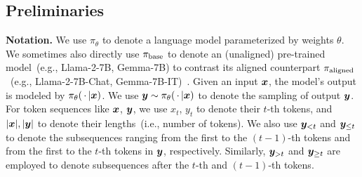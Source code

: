 

\vspace{-0.2em}
\subsection{Preliminaries}
\label{subsec:preliminaries}
\vspace{-0.2em}

\textbf{Notation.} We use $\pi_{\theta}$ to denote a language model parameterized by weights $\theta$. We sometimes also directly use $\pi_{\mathrm{base}}$ to denote an (unaligned) pre-trained model~(e.g., Llama-2-7B, Gemma-7B) to contrast its aligned counterpart $\pi_{\mathrm{aligned}}$~(e.g., Llama-2-7B-Chat, Gemma-7B-IT)~\citep{touvron2023llama-2,team2024gemma}. Given an input $\bm{x}$, the model's output is modeled by $\pi_{\theta}(\,\cdot\, | \bm{x} )$. We use $\bm{y} \sim \pi_{\theta}(\,\cdot\, | \bm{x} )$ to denote the sampling of output $\bm{y}$. %
For token sequences like $\bm{x}$, $\bm{y}$, we use $x_t$, $y_t$ to denote their $t$-th tokens, and $|\bm{x}|, |\bm{y}|$ to denote their lengths~(i.e., number of tokens). We also use $\bm{y}_{<t}$ and $\bm{y}_{\le t}$ to denote the subsequences ranging from the first to the $(t-1)$-th tokens and from the first to the $t$-th tokens in $\bm{y}$, respectively. Similarly, $\bm{y}_{>t}$ and $\bm{y}_{\ge t}$ are employed to denote subsequences after the $t$-th and $(t-1)$-th tokens.



